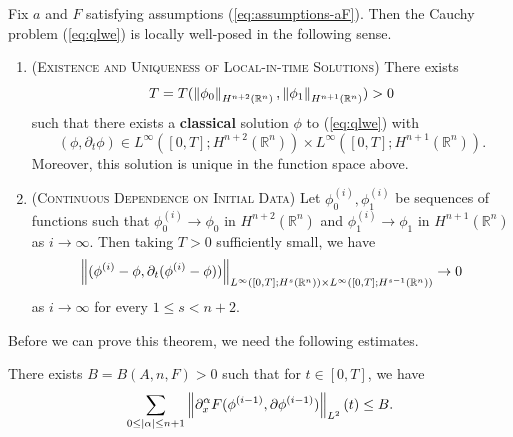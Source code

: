 \documentclass{article}
\begin{document}
\begin{theorem}
	Fix $a$ and $F$ satisfying assumptions (\ref{eq:assumptions-aF}). Then the Cauchy problem (\ref{eq:qlwe}) is locally well-posed in the following sense. \vspace{-0.2cm} 
	\begin{enumerate}
		\item (\textsc{Existence and Uniqueness of Local-in-time Solutions}) There exists 
		\begin{equation*}
			T = T(\left\Vert \phi_{0} \right\Vert_{H^{n + 2}(\mathbb{R}^{n})}, \left\Vert \phi_{1} \right\Vert_{H^{n + 1}(\mathbb{R}^{n})}) > 0 
		\end{equation*}
		such that there exists a \textbf{classical} solution $\phi$ to (\ref{eq:qlwe}) with 
		\begin{equation*}
			(\phi, \partial_{t}\phi) \in L^{\infty}([0,T]; H^{n + 2}(\mathbb{R}^{n})) \times L^{\infty}([0,T]; H^{n + 1}(\mathbb{R}^{n})). 
		\end{equation*} 
		Moreover, this solution is unique in the function space above.
		\item (\textsc{Continuous Dependence on Initial Data}) Let $\phi_{0}^{(i)}, \phi_{1}^{(i)}$ be sequences of functions such that $\phi_{0}^{(i)} \to \phi_{0}$ in $H^{n + 2}(\mathbb{R}^{n})$ and $\phi_{1}^{(i)} \to \phi_{1}$ in $H^{n + 1}(\mathbb{R}^{n})$ as $i \to \infty$. Then taking $T > 0$ sufficiently small, we have 
		\begin{equation*}
			\left\Vert (\phi^{(i)} - \phi, \partial_{t}(\phi^{(i)} - \phi)) \right\Vert_{L^{\infty}([0,T];H^{s}(\mathbb{R}^{n})) \times L^{\infty}([0,T]; H^{s - 1}(\mathbb{R}^{n}))} \to 0
		\end{equation*} 
		as $i \to \infty$ for every $1 \leq s < n + 2$. 
	\end{enumerate}
	\label{thm:nlwlwp}
\end{theorem} 
Before we can prove this theorem, we need the following estimates. 
\begin{lemma}
	There exists $B = B(A, n, F) > 0$ such that for $t \in [0,T]$, we have 
	\begin{equation*}
		\sum_{0 \leq |\alpha|\leq n + 1}\left\Vert \partial_{x}^{\alpha}F(\phi^{(i - 1)}, \partial \phi^{(i - 1)}) \right\Vert_{L^{2}}(t) \leq B. 
	\end{equation*} 
	\label{lemm:bound_F}
\end{lemma} 
\end{document}
